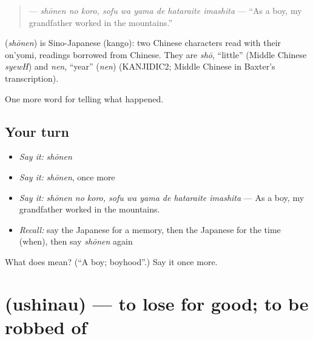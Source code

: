\begin{quote}
\textbf{   } — \emph{shōnen no koro, sofu wa yama de hataraite imashita} — \textquotedblleft{}As a boy, my grandfather worked in the mountains.\textquotedblright{}
\end{quote}

\begin{cousinweb}
\textbf{} (\emph{shōnen}) is Sino-Japanese (kango): two Chinese characters read with their on'yomi, readings borrowed from Chinese. They are \emph{shō}, \textquotedblleft{}little\textquotedblright{} (Middle Chinese \emph{syewH}) and \emph{nen}, \textquotedblleft{}year\textquotedblright{} (\emph{nen}) (KANJIDIC2; Middle Chinese in Baxter's transcription).
\end{cousinweb}

\begin{grammarlens}[title={What you've built}]
One more word for telling what happened.
\end{grammarlens}

\subsection*{Your turn}
\begin{itemize}
\raggedright
  \item \emph{Say it:} \emph{shōnen}
  \item \emph{Say it:} \emph{shōnen}, once more
  \item \emph{Say it:} \emph{shōnen no koro, sofu wa yama de hataraite imashita} — As a boy, my grandfather worked in the mountains.
  \item \emph{Recall:} say the Japanese for a memory, then the Japanese for the time (when), then say \emph{shōnen} again
\end{itemize}

\begin{tcolorbox}[breakable,colback=teal!4,colframe=teal!35!black,title={Before you move on}]
What does  mean? (\textquotedblleft{}A boy; boyhood\textquotedblright{}.) Say it once more.
\end{tcolorbox}
\section[\texorpdfstring{\ja{うしなう} (ushinau)}{うしなう (ushinau)}]{ (ushinau) — to lose for good; to be robbed of}

